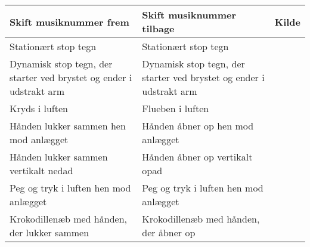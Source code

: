 \begin{table}[H]
	\centering
	\begin{tabular}{| p{4cm} | p{4cm} | p{4cm} |}
		\hline
		\textbf{Skift musiknummer frem} & \textbf{Skift musiknummer tilbage} & \textbf{Kilde} \\ \hline
		Stationært stop tegn & Stationært stop tegn & \parencite[s. 166]{PDF:ComparingInputModalities} \\ \hline
		Dynamisk stop tegn, der starter ved brystet og ender i udstrakt arm  & Dynamisk stop tegn, der starter ved brystet og ender i udstrakt arm &  \\ \hline
		Kryds i luften & Flueben i luften & \parencite[s. 48]{PDF:UserDefinedGesturesTV} \\ \hline
		Hånden lukker sammen hen mod anlægget & Hånden åbner op hen mod anlægget & \\ \hline
		Hånden lukker sammen vertikalt nedad & Hånden åbner op vertikalt opad &  \\ \hline
		Peg og tryk i luften hen mod anlægget & Peg og tryk i luften hen mod anlægget & \parencite[s. 48]{PDF:UserDefinedGesturesTV} \\ \hline
		Krokodillenæb med hånden, der lukker sammen & Krokodillenæb med hånden, der åbner op & \parencite[s. 48]{PDF:UserDefinedGesturesTV} \\ \hline
	\end{tabular}
	\label{tab:IndsamledeGestikkerSkift}
\end{table}
\noindent
